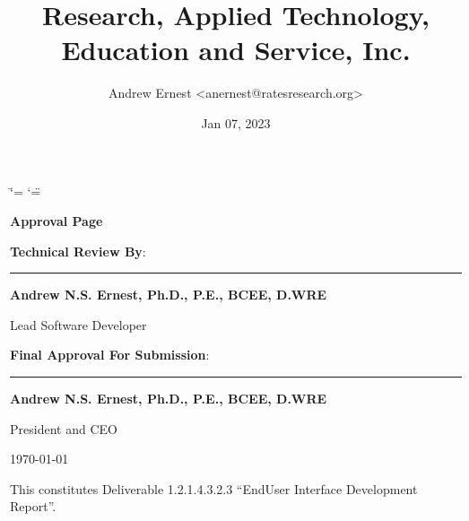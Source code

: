 \documentclass[letterpaper,12pt,english,openany,oneside]{sphinxmanual}
\title{Research, Applied Technology, Education and Service, Inc.}
\date{Jan 07, 2023}
\author{Andrew Ernest <anernest@ratesresearch.org>}
\begin{document}
\ifdefined\shorthandoff
  \ifnum\catcode`\=\string=\active\shorthandoff{=}\fi
  \ifnum\catcode`\"=\active{}\fi
\fi

\pagestyle{empty}
 
\sphinxmaketitle
    \newcommand\signature[3]{%
    {\sffamily
    \vspace{1cm}\par
    \textbf{#1}:\par
        \begin{minipage}{10cm}
        \centering
        \vspace{3cm}\par
        \rule{10cm}{1pt}\par
        \textbf{#2}\par
        #3%
        \end{minipage}
    }
    }
    \newcommand\insertdate[1][\today]{\vfill\begin{flushright}#1\end{flushright}}
    {\LARGE\sffamily \textbf{Approval Page}}
    
    \signature{Technical Review By}{Andrew N.S. Ernest, Ph.D., P.E., BCEE, D.WRE}{Lead Software Developer}
    
    \signature{Final Approval For Submission}{Andrew N.S. Ernest, Ph.D., P.E., BCEE, D.WRE}{President and CEO}
        
    \insertdate

\pagestyle{plain}
\sphinxtableofcontents
\pagestyle{normal}
\label{\detokenize{euidev/index::doc}}


\sphinxAtStartPar
This constitutes Deliverable 1.2.1.4.3.2.3 “End\sphinxhyphen{}User Interface Development Report”.

\sphinxstepscope
\end{document}
